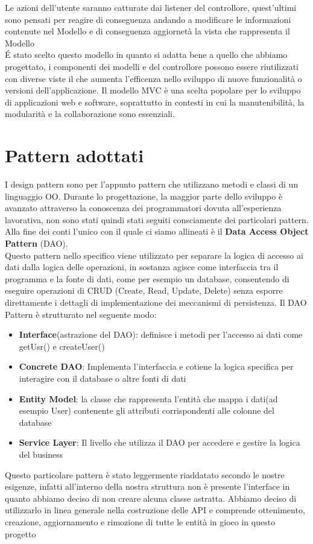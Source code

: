 \documentclass[a4paper, 11pt,oneside]{book}
\newcommand{\spacing}{\par\bigskip\noindent}
\begin{document}
    Le azioni dell'utente saranno catturate dai listener del controllore, quest'ultimi sono pensati per reagire di conseguenza andando a modificare le informazioni contenute nel Modello e di conseguenza aggiornetà la vista che rappresenta il Modello\\
    \'E stato scelto questo modello in quanto si adatta bene a quello che abbiamo progettato, i componenti dei modelli e del controllore possono essere riutilizzati con diverse viste il che aumenta l'efficenza nello sviluppo di nuove funzionalità o versioni dell'applicazione. Il modello MVC è una scelta popolare per lo sviluppo 
    di applicazioni web e software, soprattutto in contesti in cui la manutenibilità, la modularità e la collaborazione sono essenziali.
    \spacing
    

\chapter{Pattern adottati}
    I design pattern sono per l'appunto pattern che utilizzano metodi e classi di un linguaggio OO. Durante lo progettazione, la maggior parte dello sviluppo è avanzato attraverso la conoscenza dei programmatori dovuta all'esperienza lavorativa, non sono stati quindi stati seguiti consciamente dei particolari pattern. Alla fine dei conti 
    l'unico con il quale ci siamo allineati è il \textbf{Data Access Object Pattern} (DAO).\\
    Questo pattern nello specifico viene utilizzato per separare la logica di accesso ai dati dalla logica delle operazioni, in sostanza agisce come interfaccia tra il programma e la fonte di dati, come per esempio un database, consentendo di eseguire operazioni di CRUD (Create, Read, Update, Delete) senza esporre direttamente
    i dettagli di implementazione dei meccanismi di persistenza. Il DAO Pattern è strutturato nel seguente modo:
    \begin{itemize}
        \item \textbf{Interface}(astrazione del DAO): definisce i metodi per l'accesso ai dati come getUsr() e createUser()
        \item \textbf{Concrete DAO}: Implementa l'interfaccia e cotiene la logica specifica per interagire con il database o altre fonti di dati
        \item \textbf{Entity Model}: la classe che rappresenta l'entità che mappa i dati(ad esempio User) contenente gli attributi corrispondenti alle colonne del database
        \item \textbf{Service Layer}: Il livello che utilizza il DAO per accedere e gestire la logica del business
    \end{itemize}
    Questo particolare pattern è stato leggermente riaddatato secondo le nostre esigenze, infatti all'interno della nostra struttura non è presente l'interface in quanto abbiamo deciso di non creare alcuna classe astratta.
    Abbiamo deciso di utilizzarlo in linea generale nella costruzione delle API e comprende ottenimento, creazione, aggiornamento e rimozione di tutte le entità in gioco in questo progetto
\end{document}
